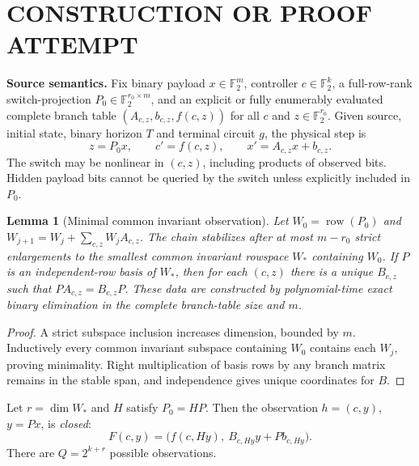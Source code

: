 \documentclass[11pt]{article}
\newtheorem{lemma}[theorem]{Lemma}
\begin{document}
\section{CONSTRUCTION OR PROOF ATTEMPT}
\noindent\textbf{Source semantics.} Fix binary payload $x\in\mathbb F_2^m$, controller $c\in\mathbb F_2^k$, a full-row-rank switch-projection $P_0\in\mathbb F_2^{r_0\times m}$, and an explicit or fully enumerably evaluated complete branch table $(A_{c,z},b_{c,z},f(c,z))$ for all $c$ and $z\in\mathbb F_2^{r_0}$. Given source, initial state, binary horizon $T$ and terminal circuit $g$, the physical step is
\[
 z=P_0x,\qquad c'=f(c,z),\qquad x'=A_{c,z}x+b_{c,z}.
\]
The switch may be nonlinear in $(c,z)$, including products of observed bits. Hidden payload bits cannot be queried by the switch unless explicitly included in $P_0$.

\begin{lemma}[Minimal common invariant observation]
Let $W_0=\operatorname{row}(P_0)$ and $W_{j+1}=W_j+\sum_{c,z}W_jA_{c,z}$. The chain stabilizes after at most $m-r_0$ strict enlargements to the smallest common invariant rowspace $W_*$ containing $W_0$. If $P$ is an independent-row basis of $W_*$, then for each $(c,z)$ there is a unique $B_{c,z}$ such that $PA_{c,z}=B_{c,z}P$. These data are constructed by polynomial-time exact binary elimination in the complete branch-table size and $m$.
\end{lemma}
\begin{proof}
A strict subspace inclusion increases dimension, bounded by $m$. Inductively every common invariant subspace containing $W_0$ contains each $W_j$, proving minimality. Right multiplication of basis rows by any branch matrix remains in the stable span, and independence gives unique coordinates for $B$.
\end{proof}
Let $r=\dim W_*$ and $H$ satisfy $P_0=HP$. Then the observation $h=(c,y)$, $y=Px$, is \emph{closed}:
\[
F(c,y)=\bigl(f(c,Hy),\ B_{c,Hy}y+Pb_{c,Hy}\bigr).
\]
There are $Q=2^{k+r}$ possible observations.
\end{document}
